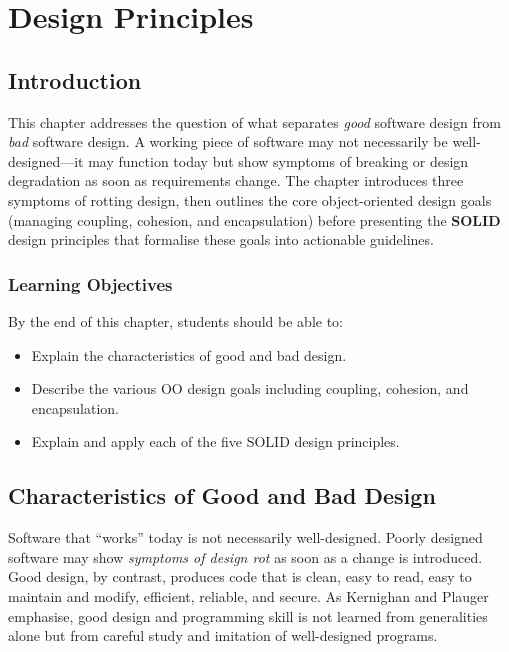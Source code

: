 \documentclass[11pt, a4paper, notitlepage]{report}
\theoremstyle{definition}
\theoremstyle{remark}
\theoremstyle{definition}
\begin{document}
\chapter{Design Principles}
\label{chap:ch9-design-principles}

\section{Introduction}
\label{sec:ch9-intro}

This chapter addresses the question of what separates \emph{good} software design from
\emph{bad} software design. A working piece of software may not necessarily be
well-designed---it may function today but show symptoms of breaking or design
degradation as soon as requirements change. The chapter introduces three symptoms
of rotting design, then outlines the core object-oriented design goals (managing
coupling, cohesion, and encapsulation) before presenting the \textbf{SOLID} design
principles that formalise these goals into actionable guidelines.

\subsection{Learning Objectives}

By the end of this chapter, students should be able to:
\begin{itemize}
  \item Explain the characteristics of good and bad design.
  \item Describe the various OO design goals including coupling, cohesion, and
        encapsulation.
  \item Explain and apply each of the five SOLID design principles.
\end{itemize}

\section{Characteristics of Good and Bad Design}
\label{sec:ch9-good-bad}

Software that ``works'' today is not necessarily well-designed. Poorly designed
software may show \emph{symptoms of design rot} as soon as a change is introduced.
Good design, by contrast, produces code that is clean, easy to read, easy to
maintain and modify, efficient, reliable, and secure. As Kernighan and Plauger
emphasise, good design and programming skill is not learned from generalities
alone but from careful study and imitation of well-designed programs.
\end{document}
